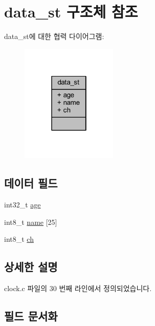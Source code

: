 \hypertarget{structdata__st}{}\section{data\+\_\+st 구조체 참조}
\label{structdata__st}


data\+\_\+st에 대한 협력 다이어그램\+:
\nopagebreak
\begin{figure}[H]
\begin{center}
\leavevmode
\includegraphics[width=130pt]{structdata__st__coll__graph}
\end{center}
\end{figure}
\subsection*{데이터 필드}
\begin{DoxyCompactItemize}
\item 
int32\+\_\+t \hyperlink{structdata__st_a63164120dd2834709fae48ecb4a9234e}{age}
\item 
int8\+\_\+t \hyperlink{structdata__st_aa6a4a36f30f93c1588dccd3030f66c37}{name} \mbox{[}25\mbox{]}
\item 
int8\+\_\+t \hyperlink{structdata__st_a6c669ea96fcb54a44ce1d6adf7969d80}{ch}
\end{DoxyCompactItemize}


\subsection{상세한 설명}


clock.\+c 파일의 30 번째 라인에서 정의되었습니다.



\subsection{필드 문서화}
\mbox{\label{structdata__st_a63164120dd2834709fae48ecb4a9234e}} 
